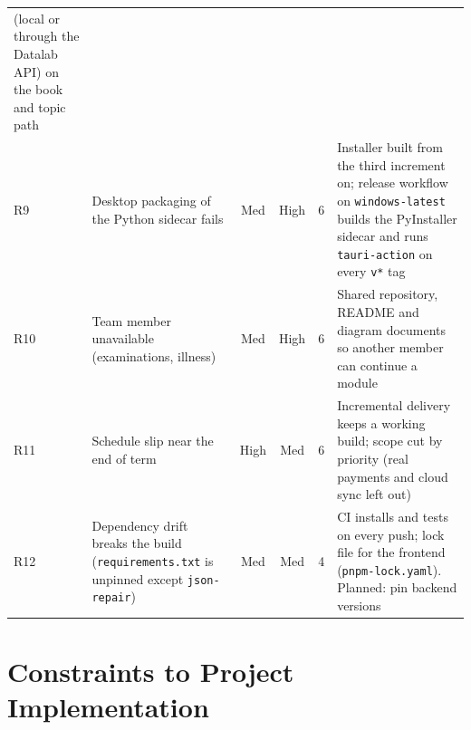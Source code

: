 \begin{small}
\begin{longtable}{@{}l >{\raggedright\arraybackslash}p{3.6cm} c c c >{\raggedright\arraybackslash}p{6.0cm}@{}}
(local or through the Datalab API) on the book and topic path\\
R9 & Desktop packaging of the Python sidecar fails & Med & High & 6 & Installer built from the
third increment on; release workflow on \texttt{windows-latest} builds the PyInstaller
sidecar and runs \texttt{tauri-action} on every \texttt{v*} tag\\
R10 & Team member unavailable (examinations, illness) & Med & High & 6 & Shared repository,
README and diagram documents so another member can continue a module\\
R11 & Schedule slip near the end of term & High & Med & 6 & Incremental delivery keeps a
working build; scope cut by priority (real payments and cloud sync left out)\\
R12 & Dependency drift breaks the build (\texttt{requirements.txt} is unpinned except
\texttt{json-repair}) & Med & Med & 4 & CI installs and tests on every push; lock file for
the frontend (\texttt{pnpm-lock.yaml}). Planned: pin backend versions\\
\end{longtable}
\end{small}

\section{Constraints to Project Implementation}

